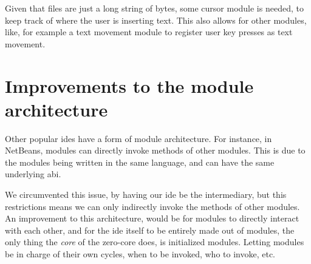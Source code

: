 Given that files are just a long string of bytes, some cursor module is needed,
to keep track of where the user is inserting text. This also allows for other
modules, like, for example a text movement module to register user key presses
as text movement.


\section{Improvements to the module architecture}

Other popular \gls*{ide}s have a form of module architecture. For instance, in
NetBeans, modules can directly invoke methods of other modules. This is due to
the modules being written in the same language, and can have the same underlying
\gls*{abi}.

We circumvented this issue, by having our \gls*{ide} be the intermediary, but
this restrictions means we can only indirectly invoke the methods of other
modules. An improvement to this architecture, would be for modules to directly
interact with each other, and for the \gls*{ide} itself to be entirely made out
of modules, the only thing the \textit{core} of the zero-core does, is
initialized modules. Letting modules be in charge of their own cycles, when to
be invoked, who to invoke, etc.
